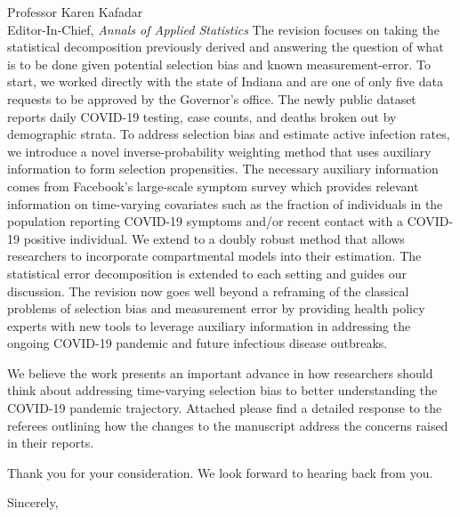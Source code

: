 \documentclass[10pt]{letter} %
\begin{document}
\begin{letter}{Professor Karen Kafadar \\
    Editor-In-Chief, {\em Annals of Applied Statistics}
         }
The revision focuses on taking the statistical decomposition previously derived and answering the question of what is to be done given potential selection bias and known measurement-error.  To start, we worked directly with the state of Indiana and are one of only five data requests to be approved by the Governor's office.  The newly public dataset reports daily COVID-19 testing, case counts, and deaths broken out by demographic strata.  To address selection bias and estimate active infection rates, we introduce a novel inverse-probability weighting method that uses auxiliary information to form selection propensities.  The necessary auxiliary information comes from Facebook's large-scale symptom survey which provides relevant information on time-varying covariates such as the fraction of individuals in the population reporting COVID-19 symptoms and/or recent contact with a COVID-19 positive individual.  We extend to a doubly robust method that allows researchers to incorporate compartmental models into their estimation.  The statistical error decomposition is extended to each setting and guides our discussion. The revision now goes well beyond a reframing of the classical problems of selection bias and measurement error by providing health policy experts with new tools to leverage auxiliary information in addressing the ongoing COVID-19 pandemic and future infectious disease outbreaks.

We believe the work presents an important advance in how researchers should think about addressing time-varying selection bias to better understanding the COVID-19 pandemic trajectory. Attached please find a detailed response to the referees outlining how the changes to the manuscript address the concerns raised in their reports.

Thank you for your consideration. We look forward to hearing back from you.

\closing{Sincerely,}


\end{letter}
\end{document}
